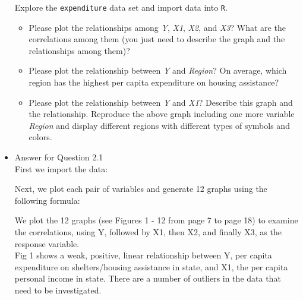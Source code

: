 \documentclass[12pt,letterpaper]{article}
\begin{document}
\begin{itemize}
\vspace{.5cm}
\noindent Explore the \texttt{expenditure} data set and import data into \texttt{R}.
\vspace{.5cm}
  
\vspace{.5cm}
\begin{itemize}

\item
Please plot the relationships among \emph{Y}, \emph{X1}, \emph{X2}, and \emph{X3}? What are the correlations among them (you just need to describe the graph and the relationships among them)?
\vspace{.5cm}

\item
Please plot the relationship between \emph{Y} and \emph{Region}? On average, which region has the highest per capita expenditure on housing assistance?
\vspace{.5cm}
\item
Please plot the relationship between \emph{Y} and \emph{X1}? Describe this graph and the relationship. Reproduce the above graph including one more variable \emph{Region} and display different regions with different types of symbols and colors.
\end{itemize}

\item
Answer for Question 2.1\\

\noindent First we import the data:\\
\vspace{.5cm}
  
\vspace{.5cm}

\noindent Next, we plot each pair of variables and generate 12 graphs using the following formula:\\
\vspace{.5cm}
  
\vspace{.5cm}

\noindent We plot the 12 graphs (see Figures 1 - 12 from page 7 to page 18) to examine the correlations, using Y, followed by X1, then X2, and finally X3, as the response variable.\\

\noindent Fig 1 shows a weak, positive, linear relationship between Y, per capita expenditure on shelters/housing assistance in state, and X1, the per capita personal income in state. There are a number of outliers in the data that need to be investigated.\\


\end{itemize}
\end{document}
